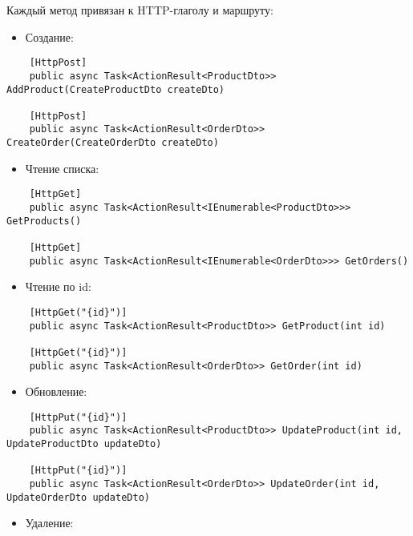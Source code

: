 \documentclass[a4paper,12pt]{report}
\begin{document}
Каждый метод привязан к \acs{HTTP}-глаголу и маршруту:
\begin{itemize}
    \item Создание:
\end{itemize}

\begin{verbatim}
    [HttpPost]
    public async Task<ActionResult<ProductDto>> AddProduct(CreateProductDto createDto)

    [HttpPost]
    public async Task<ActionResult<OrderDto>> CreateOrder(CreateOrderDto createDto)
\end{verbatim}

\begin{itemize}
    \item Чтение списка:
\end{itemize}

\begin{verbatim}
    [HttpGet]
    public async Task<ActionResult<IEnumerable<ProductDto>>> GetProducts()

    [HttpGet]
    public async Task<ActionResult<IEnumerable<OrderDto>>> GetOrders()
\end{verbatim}

\begin{itemize}
    \item Чтение по id:
\end{itemize}

\begin{verbatim}
    [HttpGet("{id}")]
    public async Task<ActionResult<ProductDto>> GetProduct(int id)

    [HttpGet("{id}")]
    public async Task<ActionResult<OrderDto>> GetOrder(int id) 
\end{verbatim}

\begin{itemize}
    \item Обновление:
\end{itemize}

\begin{verbatim}
    [HttpPut("{id}")]
    public async Task<ActionResult<ProductDto>> UpdateProduct(int id, UpdateProductDto updateDto)
    
    [HttpPut("{id}")]
    public async Task<ActionResult<OrderDto>> UpdateOrder(int id, UpdateOrderDto updateDto)
\end{verbatim}

\begin{itemize}
    \item Удаление:
\end{itemize}
    
\end{document}
